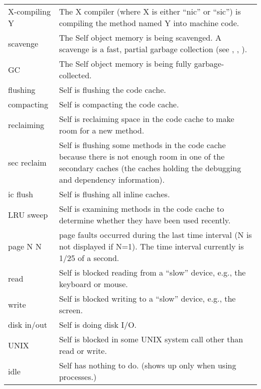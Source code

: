 \documentclass[letterpaper,10pt,english]{sphinxmanual}
\begin{document}
\noindent\begin{tabulary}{\linewidth}{p{5cm} p{10cm}}
\hline
{}\relax &\relax \\
\hline
X-compiling Y
&
The X compiler (where X is either “nic” or “sic”) is compiling the method named Y into machine
code.
\\
\hline
scavenge
&
The Self object memory is being scavenged. A scavenge is a fast, partial garbage collection (see
{\hyperref[\detokenize{ref:citations}]{}} , {\hyperref[\detokenize{ref:citations}]{}} , {\hyperref[\detokenize{ref:citations}]{}} ).
\\
\hline
GC
&
The Self object memory is being fully garbage-collected.
\\
\hline
flushing
&
Self is flushing the code cache.
\\
\hline
compacting
&
Self is compacting the code cache.
\\
\hline
reclaiming
&
Self is reclaiming space in the code cache to make room for a new method.
\\
\hline
sec reclaim
&
Self is flushing some methods in the code cache because there is not enough room in one of the
secondary caches (the caches holding the debugging and dependency information).
\\
\hline
ic flush
&
Self is flushing all inline caches.
\\
\hline
LRU sweep
&
Self is examining methods in the code cache to determine whether they have been used recently.
\\
\hline
page N N
&
page faults occurred during the last time interval (N is not displayed if N=1). The time interval
currently is 1/25 of a second.
\\
\hline
read
&
Self is blocked reading from a “slow” device, e.g., the keyboard or mouse.
\\
\hline
write
&
Self is blocked writing to a “slow” device, e.g., the screen.
\\
\hline
disk in/out
&
Self is doing disk I/O.
\\
\hline
UNIX
&
Self is blocked in some UNIX system call other than read or write.
\\
\hline
idle
&
Self has nothing to do. (shows up only when using processes.)
\\
\hline\end{tabulary}
\end{document}
